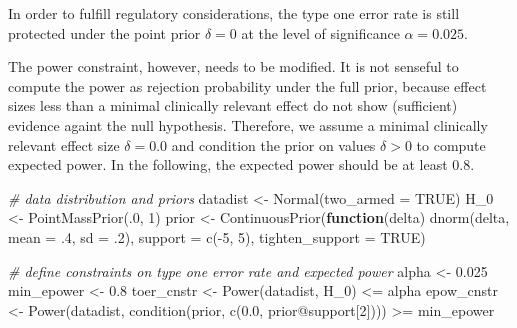 \documentclass[
]{book}
\newenvironment{Shaded}{\begin{snugshade}}{\end{snugshade}}
\newcommand{\AttributeTok}[1]{\textcolor[rgb]{0.77,0.63,0.00}{#1}}
\newcommand{\CommentTok}[1]{\textcolor[rgb]{0.56,0.35,0.01}{\textit{#1}}}
\newcommand{\ConstantTok}[1]{\textcolor[rgb]{0.00,0.00,0.00}{#1}}
\newcommand{\ControlFlowTok}[1]{\textcolor[rgb]{0.13,0.29,0.53}{\textbf{#1}}}
\newcommand{\DecValTok}[1]{\textcolor[rgb]{0.00,0.00,0.81}{#1}}
\newcommand{\FloatTok}[1]{\textcolor[rgb]{0.00,0.00,0.81}{#1}}
\newcommand{\FunctionTok}[1]{\textcolor[rgb]{0.00,0.00,0.00}{#1}}
\newcommand{\NormalTok}[1]{#1}
\newcommand{\OtherTok}[1]{\textcolor[rgb]{0.56,0.35,0.01}{#1}}
\newcommand{\SpecialCharTok}[1]{\textcolor[rgb]{0.00,0.00,0.00}{#1}}
\begin{document}
In order to fulfill regulatory considerations, the type one error rate
is still protected under the point prior \(\delta = 0\) at the level
of significance \(\alpha = 0.025\).

The power constraint, however, needs to be modified.
It is not senseful to compute the power as rejection probability under
the full prior, because effect sizes less than a minimal clinically relevant
effect do not show (sufficient) evidence againt the null hypothesis.
Therefore, we assume a minimal clinically relevant effect size
\(\delta = 0.0\) and condition the prior on values \(\delta > 0\)
to compute expected power.
In the following, the expected power should be at least \(0.8\).

\begin{Shaded}
\begin{Highlighting}[]
\CommentTok{\# data distribution and priors}
\NormalTok{datadist   }\OtherTok{\textless{}{-}} \FunctionTok{Normal}\NormalTok{(}\AttributeTok{two\_armed =} \ConstantTok{TRUE}\NormalTok{)}
\NormalTok{H\_0        }\OtherTok{\textless{}{-}} \FunctionTok{PointMassPrior}\NormalTok{(.}\DecValTok{0}\NormalTok{, }\DecValTok{1}\NormalTok{)}
\NormalTok{prior      }\OtherTok{\textless{}{-}} \FunctionTok{ContinuousPrior}\NormalTok{(}\ControlFlowTok{function}\NormalTok{(delta) }\FunctionTok{dnorm}\NormalTok{(delta, }\AttributeTok{mean =}\NormalTok{ .}\DecValTok{4}\NormalTok{, }\AttributeTok{sd =}\NormalTok{ .}\DecValTok{2}\NormalTok{),}
                              \AttributeTok{support =} \FunctionTok{c}\NormalTok{(}\SpecialCharTok{{-}}\DecValTok{5}\NormalTok{, }\DecValTok{5}\NormalTok{),}
                              \AttributeTok{tighten\_support =} \ConstantTok{TRUE}\NormalTok{)}

\CommentTok{\# define constraints on type one error rate and expected power}
\NormalTok{alpha      }\OtherTok{\textless{}{-}} \FloatTok{0.025}
\NormalTok{min\_epower }\OtherTok{\textless{}{-}} \FloatTok{0.8}
\NormalTok{toer\_cnstr }\OtherTok{\textless{}{-}} \FunctionTok{Power}\NormalTok{(datadist, H\_0) }\SpecialCharTok{\textless{}=}\NormalTok{ alpha}
\NormalTok{epow\_cnstr }\OtherTok{\textless{}{-}} \FunctionTok{Power}\NormalTok{(datadist, }\FunctionTok{condition}\NormalTok{(prior, }\FunctionTok{c}\NormalTok{(}\FloatTok{0.0}\NormalTok{, prior}\SpecialCharTok{@}\NormalTok{support[}\DecValTok{2}\NormalTok{]))) }\SpecialCharTok{\textgreater{}=}\NormalTok{ min\_epower}
\end{Highlighting}
\end{Shaded}
\end{document}
